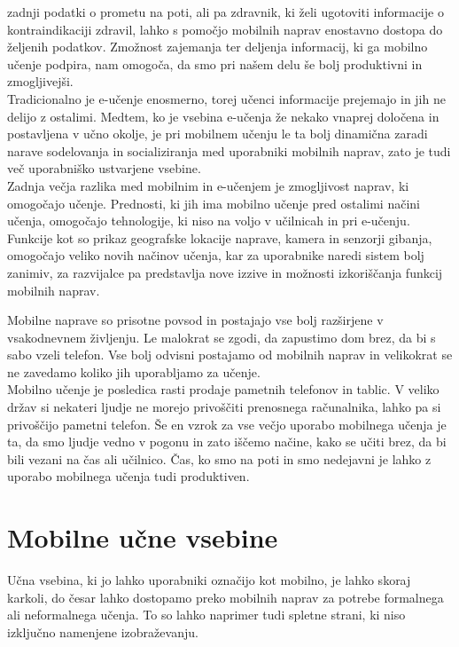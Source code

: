 \documentclass[a4paper, 12pt]{book}
\begin{document}
zadnji podatki o prometu na poti, ali pa zdravnik, ki želi ugotoviti informacije o kontraindikaciji zdravil, lahko s pomočjo mobilnih naprav enostavno dostopa do željenih podatkov. Zmožnost zajemanja ter deljenja informacij, ki ga mobilno učenje podpira, nam omogoča, da smo pri našem delu še bolj produktivni in zmogljivejši.
\\Tradicionalno je e-učenje enosmerno, torej učenci informacije prejemajo in jih ne delijo z ostalimi. Medtem, ko je vsebina e-učenja že nekako vnaprej določena in postavljena v učno okolje, je pri mobilnem učenju le ta bolj dinamična zaradi narave sodelovanja in socializiranja med uporabniki mobilnih naprav, zato je tudi več uporabniško ustvarjene vsebine.\\ Zadnja večja razlika med mobilnim in e-učenjem je zmogljivost naprav, ki omogočajo učenje. Prednosti, ki jih ima mobilno učenje pred ostalimi načini učenja, omogočajo tehnologije, ki niso na voljo v učilnicah in pri e-učenju. Funkcije kot so prikaz geografske lokacije naprave, kamera in senzorji gibanja, omogočajo veliko novih načinov učenja, kar za uporabnike naredi sistem bolj zanimiv, za razvijalce pa predstavlja nove izzive in možnosti izkoriščanja funkcij mobilnih naprav.

Mobilne naprave so prisotne povsod in postajajo vse bolj razširjene v vsakodnevnem življenju. Le malokrat se zgodi, da zapustimo dom brez, da bi s sabo vzeli telefon. Vse bolj odvisni postajamo od mobilnih naprav in velikokrat se ne zavedamo koliko jih uporabljamo za učenje.\\
Mobilno učenje je posledica rasti prodaje pametnih telefonov in tablic. V veliko držav si nekateri ljudje ne morejo privoščiti prenosnega računalnika, lahko pa si privoščijo pametni telefon. Še en vzrok za vse večjo uporabo mobilnega učenja je ta, da smo ljudje vedno v pogonu in zato iščemo načine, kako se učiti brez, da bi bili vezani na čas ali učilnico. Čas, ko smo na poti in smo nedejavni je lahko z uporabo mobilnega učenja tudi produktiven.

\section{Mobilne učne vsebine}
Učna vsebina, ki jo lahko uporabniki označijo kot mobilno, je lahko skoraj karkoli, do česar lahko dostopamo preko mobilnih naprav za potrebe formalnega ali neformalnega učenja. To so lahko naprimer tudi spletne strani, ki niso izključno namenjene izobraževanju.
\end{document}

